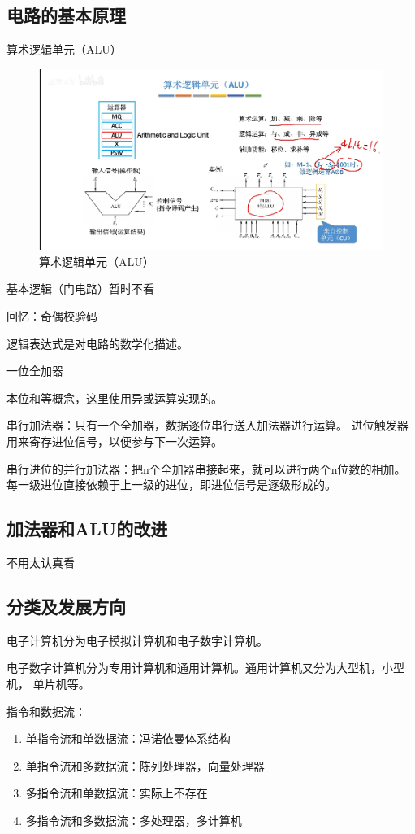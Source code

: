 \documentclass[12pt]{ctexart}
\begin{document}
\subsection{电路的基本原理}
算术逻辑单元（ALU）
\begin{figure}[htbp]
    \centering
    \includegraphics[scale=0.6]{算术逻辑单元.png}
    \caption{算术逻辑单元（ALU）}
    \end{figure}
基本逻辑（门电路）暂时不看

回忆：奇偶校验码

逻辑表达式是对电路的数学化描述。

一位全加器

本位和等概念，这里使用异或运算实现的。

串行加法器：只有一个全加器，数据逐位串行送入加法器进行运算。
进位触发器用来寄存进位信号，以便参与下一次运算。

串行进位的并行加法器：把n个全加器串接起来，就可以进行两个n位数的相加。
每一级进位直接依赖于上一级的进位，即进位信号是逐级形成的。

\subsection{加法器和ALU的改进}
不用太认真看

\subsection{分类及发展方向}
电子计算机分为电子模拟计算机和电子数字计算机。

电子数字计算机分为专用计算机和通用计算机。通用计算机又分为大型机，小型机，
单片机等。

指令和数据流：
\begin{enumerate}
    \item 单指令流和单数据流：冯诺依曼体系结构
    \item 单指令流和多数据流：陈列处理器，向量处理器
    \item 多指令流和单数据流：实际上不存在
    \item 多指令流和多数据流：多处理器，多计算机
\end{enumerate}
\end{document}
